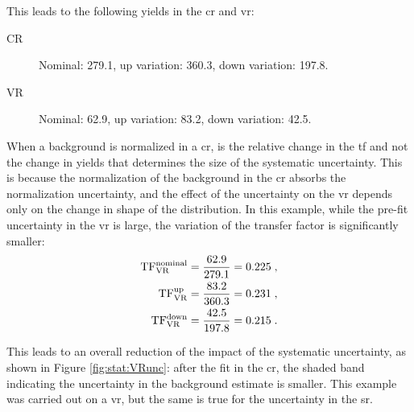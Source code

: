 \begin{itemize}
This leads to the following yields in the \gls{cr} and \gls{vr}:

\begin{description}
\item[CR] Nominal: 279.1, up variation: 360.3, down variation: 197.8.
\item[VR] Nominal: 62.9, up variation: 83.2, down variation: 42.5.
\end{description}

\noindent When a background is normalized in a \gls{cr}, is the relative change in the \gls{tf} and not the change in yields that determines the size of the systematic uncertainty.
This is because the normalization of the background in the \gls{cr} absorbs the normalization uncertainty, and the effect of the uncertainty on the \gls{vr} depends only on the change in shape of the distribution. 
In this example, while the pre-fit uncertainty in the \gls{vr} is large, the variation of the transfer factor is significantly smaller:
\begin{equation}
\begin{split}
\rm TF^{nominal}_{VR} &= \frac{62.9}{279.1} = 0.225 \; ,\\
\rm TF^{up}_{VR} &= \frac{83.2}{360.3} = 0.231 \; , \\
\rm TF^{down}_{VR} &= \frac{42.5}{197.8} = 0.215 \; . \\
\end{split}
\end{equation}

\noindent This leads to an overall reduction of the impact of the systematic uncertainty, as shown in Figure \ref{fig:stat:VRunc}:  
after the fit in the \gls{cr}, the shaded band indicating the uncertainty in the background estimate is smaller. 
This example was carried out on a \gls{vr}, but the same is true for the uncertainty in the \gls{sr}.


\end{itemize}
